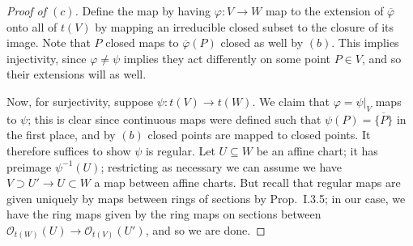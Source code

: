 \documentclass[12pt,letterpaper]{article}
\theoremstyle{definition}
\theoremstyle{remark}
\numberwithin{equation}{section}
\numberwithin{figure}{problem}
\newcommand{\OO}{\mathcal{O}}
\begin{document}
\begin{proof}[Proof of $(c)$]
  Define the map by having $\varphi\colon V \to W$ map to the extension of $\overline{\varphi}$ onto all of $t(V)$ by mapping an irreducible closed subset to the closure of its image. Note that $P$ closed maps to $\overline{\varphi}(P)$ closed as well by $(b)$. This implies injectivity, since $\varphi \ne \psi$ implies they act differently on some point $P \in V$, and so their extensions will as well.
  \par Now, for surjectivity, suppose $\psi\colon t(V) \to t(W)$. We claim that $\varphi = \psi\vert_V$ maps to $\psi$; this is clear since continuous maps were defined such that $\psi(P) = \overline{\{P\}}$ in the first place, and by $(b)$ closed points are mapped to closed points. It therefore suffices to show $\psi$ is regular. Let $U \subseteq W$ be an affine chart; it has preimage $\psi^{-1}(U)$; restricting as necessary we can assume we have $V \supset U' \to U \subset W$ a map between affine charts. But recall that regular maps are given uniquely by maps between rings of sections by Prop.~I.3.5; in our case, we have the ring maps given by the ring maps on sections between $\OO_{t(W)}(U) \to \OO_{t(V)}(U')$, and so we are done.
\end{proof}
\end{document}
